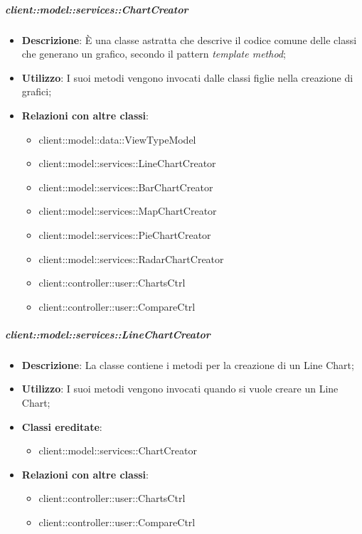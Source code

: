 \begin{itemize}
		\subparagraph{client::model::services::ChartCreator} %
		\label{subp:chartcreator}
			\begin{itemize}
				\item \textbf{Descrizione}: È una classe astratta che descrive il codice comune delle classi che generano un grafico, secondo il pattern \emph{template method};
				\item \textbf{Utilizzo}: I suoi metodi vengono invocati dalle classi figlie nella creazione di grafici;
				\item \textbf{Relazioni con altre classi}:
					\begin{itemize}
						\item client::model::data::ViewTypeModel
						\item client::model::services::LineChartCreator
						\item client::model::services::BarChartCreator
						\item client::model::services::MapChartCreator
						\item client::model::services::PieChartCreator
						\item client::model::services::RadarChartCreator
						\item client::controller::user::ChartsCtrl
						\item client::controller::user::CompareCtrl
					\end{itemize}
			\end{itemize}

		\subparagraph{client::model::services::LineChartCreator} %
		\label{subp:linechartcreator}
			\begin{itemize}
				\item \textbf{Descrizione}: La classe contiene i metodi per la creazione di un Line Chart;
				\item \textbf{Utilizzo}: I suoi metodi vengono invocati quando si vuole creare un Line Chart;
				\item \textbf{Classi ereditate}:					
					\begin{itemize}
						\item client::model::services::ChartCreator
					\end{itemize}
				\item \textbf{Relazioni con altre classi}:					
					\begin{itemize}
						\item client::controller::user::ChartsCtrl
						\item client::controller::user::CompareCtrl
					\end{itemize}
			\end{itemize}



\end{itemize}
